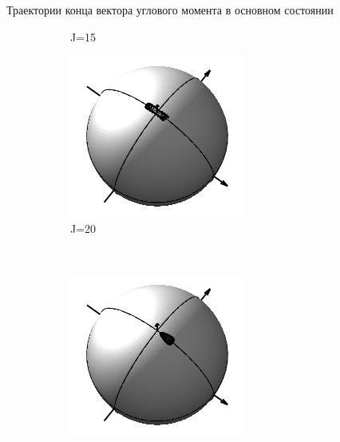 \documentclass[hyperref={pdfpagelabels=false},usepdftitle=false, xcolor = dvipsnames]{beamer}
\begin{document}
\begin{frame}{Траектории конца вектора углового момента в основном состоянии}
\begin{block}{}
\begin{figure}
\begin{subfigure}{0.3\textwidth}
    \caption{J=15}
  \end{subfigure}
  \begin{subfigure}{0.3\textwidth}
    \includegraphics[width = \linewidth]{../pictures/rigid_base/plot_J=20n=0.png}
    \caption{J=20}
  \end{subfigure} \\
  \begin{subfigure}{0.3\textwidth}
     \includegraphics[width = \linewidth]{../pictures/rigid_base/plot_J=21n=0.png}

\end{subfigure}
\end{figure}
\end{block}
\end{frame}
\end{document}
